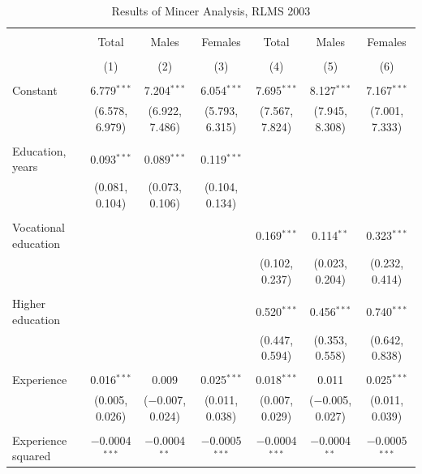\documentclass[alpha-refs]{wiley-article-01g}
\begin{document}
\begin{landscape}
	
	\fontsize{9}{11}
	\selectfont
	
	\begin{table}[!htbp] \centering 
\renewcommand{\arraystretch}{1.0}
		\caption{Results of Mincer Analysis, RLMS 2003} 
		\label{} 
		\begin{tabular}{@{\extracolsep{5pt}}lcccccc} 
			\\[-.8ex]\hline 
			\hline \\[-.8ex] 
			& Total & Males & Females & Total & Males & Females \\ 
			\\[-.8ex] & (1) & (2) & (3) & (4) & (5) & (6)\\ 
			\hline \\[-.8ex] 
			Constant & 6.779$^{***}$ & 7.204$^{***}$ & 6.054$^{***}$ & 7.695$^{***}$ & 8.127$^{***}$ & 7.167$^{***}$ \\ 
			& (6.578, 6.979) & (6.922, 7.486) & (5.793, 6.315) & (7.567, 7.824) & (7.945, 8.308) & (7.001, 7.333) \\ 
			& & & & & & \\ 
			Education, years & 0.093$^{***}$ & 0.089$^{***}$ & 0.119$^{***}$ &  &  &  \\ 
			& (0.081, 0.104) & (0.073, 0.106) & (0.104, 0.134) &  &  &  \\ 
			& & & & & & \\ 
			Vocational education &  &  &  & 0.169$^{***}$ & 0.114$^{**}$ & 0.323$^{***}$ \\ 
			&  &  &  & (0.102, 0.237) & (0.023, 0.204) & (0.232, 0.414) \\ 
			& & & & & & \\ 
			Higher education &  &  &  & 0.520$^{***}$ & 0.456$^{***}$ & 0.740$^{***}$ \\ 
			&  &  &  & (0.447, 0.594) & (0.353, 0.558) & (0.642, 0.838) \\ 
			& & & & & & \\ 
			Experience & 0.016$^{***}$ & 0.009 & 0.025$^{***}$ & 0.018$^{***}$ & 0.011 & 0.025$^{***}$ \\ 
			& (0.005, 0.026) & ($-$0.007, 0.024) & (0.011, 0.038) & (0.007, 0.029) & ($-$0.005, 0.027) & (0.011, 0.039) \\ 
			& & & & & & \\ 
			Experience squared & $-$0.0004$^{***}$ & $-$0.0004$^{**}$ & $-$0.0005$^{***}$ & $-$0.0004$^{***}$ & $-$0.0004$^{**}$ & $-$0.0005$^{***}$ \\ 

\end{tabular}
\end{table}
\end{landscape}
\end{document}
